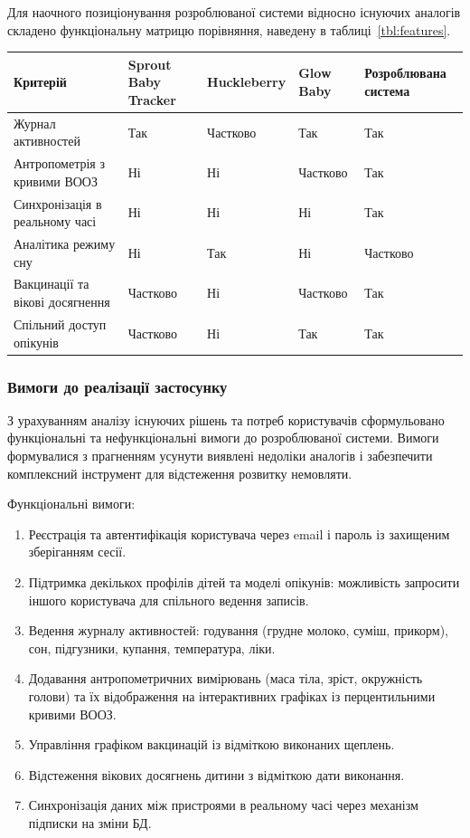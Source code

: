 Для наочного позиціонування розроблюваної системи відносно існуючих аналогів складено функціональну матрицю порівняння, наведену в таблиці~\ref{tbl:features}.

\begin{center}
\label{tbl:features}
{\small\renewcommand{\arraystretch}{1.15}
\begin{tabular}{|>{\raggedright\arraybackslash}p{4.8cm}|>{\centering\arraybackslash}p{2.4cm}|>{\centering\arraybackslash}p{2.2cm}|>{\centering\arraybackslash}p{2.1cm}|>{\centering\arraybackslash}p{2.6cm}|}
\hline
\textbf{Критерій} &
\textbf{Sprout Baby Tracker} &
\textbf{Huckleberry} &
\textbf{Glow Baby} &
\textbf{Розроблювана система} \\
\hline
Журнал активностей & Так & Частково & Так & Так \\
\hline
Антропометрія з кривими \gls{ВООЗ} & Ні & Ні & Частково & Так \\
\hline
Синхронізація в реальному часі & Ні & Ні & Ні & Так \\
\hline
Аналітика режиму сну & Ні & Так & Ні & Частково \\
\hline
Вакцинації та вікові досягнення & Частково & Ні & Частково & Так \\
\hline
Спільний доступ опікунів & Частково & Ні & Так & Так \\
\hline
\end{tabular}}
\end{center}

\subsubsection{Вимоги до реалізації застосунку}

З урахуванням аналізу існуючих рішень та потреб користувачів сформульовано функціональні та нефункціональні вимоги до розроблюваної системи. Вимоги формувалися з прагненням усунути виявлені недоліки аналогів і забезпечити комплексний інструмент для відстеження розвитку немовляти.

Функціональні вимоги:
\begin{enumerate}
  \item Реєстрація та автентифікація користувача через email і пароль із захищеним зберіганням сесії.
  \item Підтримка декількох профілів дітей та моделі опікунів: можливість запросити іншого користувача для спільного ведення записів.
  \item Ведення журналу активностей: годування (грудне молоко, суміш, прикорм), сон, підгузники, купання, температура, ліки.
  \item Додавання антропометричних вимірювань (маса тіла, зріст, окружність голови) та їх відображення на інтерактивних графіках із перцентильними кривими \gls{ВООЗ}.
  \item Управління графіком вакцинацій із відміткою виконаних щеплень.
  \item Відстеження вікових досягнень дитини з відміткою дати виконання.
  \item Синхронізація даних між пристроями в реальному часі через механізм підписки на зміни \gls{БД}.
\end{enumerate}

